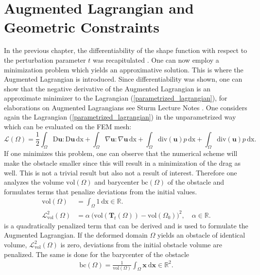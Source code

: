 \section{Augmented Lagrangian and Geometric Constraints}

In the previous chapter, the differentiability of the shape function with respect to the perturbation 
parameter $t$ was recapitulated \cite{nearly_conformal_paper}. One can now employ a minimization problem
which yields an approximative solution. This is where the Augmented Lagrangian is introduced. Since differentiability was shown,
one can show that the negative derivative of the Augmented Lagrangian is an approximate minimizer to the 
Lagrangian (\ref{parametrized_lagrangian}), for elaborations on Augmented Lagrangians see Sturm Lecture Notes \cite{lecture_notes_sturm}. 
One considers again the Lagrangian (\ref{parametrized_lagrangian}) in the unparametrized way which can be evaluated on the FEM mesh:
\begin{equation}\label{basic_lagrangian}
    \mathcal{L}(\Omega) = \frac{1}{2} \int_{\Omega} \mathrm{D}\mathbf{u}: \mathrm{D} \mathbf{u} \, \mathrm{dx} + 
	\int_{\Omega} \nabla \mathbf{u} : \nabla \mathbf{u} \, \mathrm{dx} + \int_{\Omega} \mathrm{div}(\mathbf{u})p \, \mathrm{dx} +
	 \int_{\Omega} \mathrm{div}(\mathbf{u})p \, \mathrm{dx}.
\end{equation}
If one minimizes this problem, one can observe that the numerical scheme will make the obstacle smaller since this will 
result in a minimization of the drag as well. This is not a trivial result but also not a result of interest. Therefore one analyzes the 
volume $\mathrm{vol}(\Omega)$ and barycenter $\mathrm{bc}(\Omega)$ of the obstacle and formulates terms that penalize deviations from the initial 
values.
\begin{align}
    \mathrm{vol}(\Omega) &= \int_{\Omega} 1 \ \mathrm{dx} \in \mathbb{R} \label{vol_equation}.\\
    \mathcal{L}^2_{\mathrm{vol}}(\Omega) &= \alpha \ \Big( \mathrm{vol}( \mathbf{T}_{t}(\Omega) )-\mathrm{vol}(\Omega_0) \Big)^2,
    \quad \alpha \in \mathbb{R}.
\end{align}
is a quadratically penalized term that can be derived and is used to formulate 
the Augmented Lagrangian. If the deformed domain $\Omega$ yields an obstacle of identical volume, $\mathcal{L}^2_{\mathrm{vol}}(\Omega)$ is zero, deviations 
from the initial obstacle volume are penalized. The same is done for the barycenter of the obstacle
\begin{align}
    \mathrm{bc}(\Omega) =
    \frac{1}{\mathrm{vol}(\Omega)}\int_{\Omega} \mathbf{x} \ \mathrm{d} \mathbf{x} \in \mathbb{R}^2.
\end{align}
